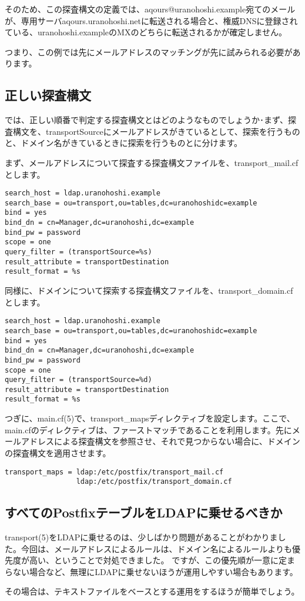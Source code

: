 そのため、この探査構文の定義では、aqours@uranohoshi.example宛てのメールが、専用サーバaqours.uranohoshi.netに転送される場合と、権威DNSに登録されている、uranohoshi.exampleのMXのどちらに転送されるかが確定しません。

つまり、この例では先にメールアドレスのマッチングが先に試みられる必要があります。

\subsection{正しい探査構文}

では、正しい順番で判定する探査構文とはどのようなものでしょうか･まず、探査構文を、transportSourceにメールアドレスがきているとして、探索を行うものと、ドメイン名がきているときに探索を行うものとに分けます。

まず、メールアドレスについて探査する探査構文ファイルを、transport\_mail.cfとします。

\begin{verbatim}
search_host = ldap.uranohoshi.example
search_base = ou=transport,ou=tables,dc=uranohoshidc=example
bind = yes
bind_dn = cn=Manager,dc=uranohoshi,dc=example
bind_pw = password
scope = one
query_filter = (transportSource=%s)
result_attribute = transportDestination
result_format = %s
\end{verbatim}

同様に、ドメインについて探索する探査構文ファイルを、transport\_domain.cfとします。

\begin{verbatim}
search_host = ldap.uranohoshi.example
search_base = ou=transport,ou=tables,dc=uranohoshidc=example
bind = yes
bind_dn = cn=Manager,dc=uranohoshi,dc=example
bind_pw = password
scope = one
query_filter = (transportSource=%d)
result_attribute = transportDestination
result_format = %s
\end{verbatim}

つぎに、main.cf(5)で、transport\_mapsディレクティブを設定します。ここで、main.cfのディレクティブは、ファーストマッチであることを利用します。先にメールアドレスによる探査構文を参照させ、それで見つからない場合に、ドメインの探査構文を適用させます。

\begin{verbatim}
transport_maps = ldap:/etc/postfix/transport_mail.cf
                 ldap:/etc/postfix/transport_domain.cf
\end{verbatim}

\subsection{すべてのPostfixテーブルをLDAPに乗せるべきか}

transport(5)をLDAPに乗せるのは、少しばかり問題があることがわかりました。今回は、メールアドレスによるルールは、ドメイン名によるルールよりも優先度が高い、ということで対処できました。
ですが、この優先順が一意に定まらない場合など、無理にLDAPに乗せないほうが運用しやすい場合もあります。

その場合は、テキストファイルをベースとする運用をするほうが簡単でしょう。